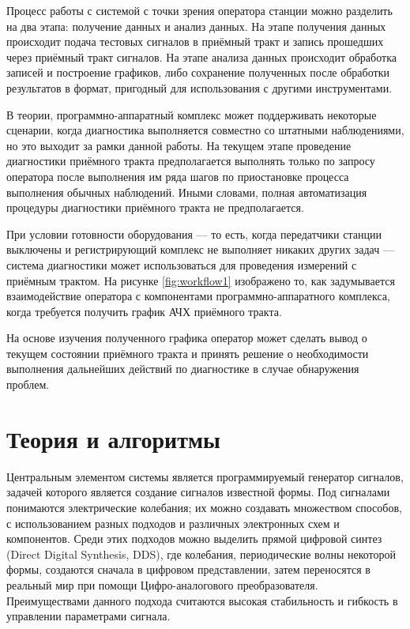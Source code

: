 \documentclass{report}
\begin{document}
Процесс работы с системой с точки зрения оператора станции можно разделить на два этапа: получение данных и анализ данных. На этапе получения данных происходит подача тестовых сигналов в приёмный тракт и запись прошедших через приёмный тракт сигналов. На этапе анализа данных происходит обработка записей и построение графиков, либо сохранение полученных после обработки результатов в формат, пригодный для использования с другими инструментами.

В теории, программно-аппаратный комплекс может поддерживать некоторые сценарии, когда диагностика выполняется совместно со штатными наблюдениями, но это выходит за рамки данной работы. На текущем этапе проведение диагностики приёмного тракта предполагается выполнять только по запросу оператора после выполнения им ряда шагов по приостановке процесса выполнения обычных наблюдений. Иными словами, полная автоматизация процедуры диагностики приёмного тракта не предполагается.

При условии готовности оборудования --- то есть, когда передатчики станции выключены и регистрирующий комплекс не выполняет никаких других задач --- система диагностики может использоваться для проведения измерений с приёмным трактом. На рисунке \ref{fig:workflow1} изображено то, как задумывается взаимодействие оператора с компонентами программно-аппаратного комплекса, когда требуется получить график АЧХ приёмного тракта.


На основе изучения полученного графика оператор может сделать вывод о текущем состоянии приёмного тракта и принять решение о необходимости выполнения дальнейших действий по диагностике в случае обнаружения проблем.

\section{Теория и алгоритмы}

Центральным элементом системы является программируемый генератор сигналов, задачей которого является создание сигналов известной формы. Под сигналами понимаются электрические колебания; их можно создавать множеством способов, с использованием разных подходов и различных электронных схем и компонентов. Среди этих подходов можно выделить прямой цифровой синтез (Direct Digital Synthesis, DDS), где колебания, периодические волны некоторой формы, создаются сначала в цифровом представлении, затем переносятся в реальный мир при помощи Цифро-аналогового преобразователя. Преимуществами данного подхода считаются высокая стабильность и гибкость в управлении параметрами сигнала.
\end{document}
